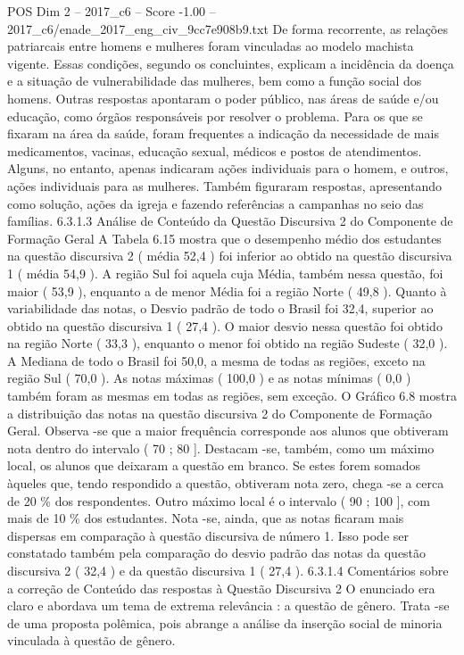 \begin{textsample}{POS Dim 2 – 2017\_c6 – Score -1.00 – 2017\_c6/enade\_2017\_eng\_civ\_9cc7e908b9.txt}
De forma recorrente, as relações patriarcais entre homens e mulheres foram vinculadas ao modelo machista vigente.
Essas condições, segundo os concluintes, explicam a incidência da doença e a situação de vulnerabilidade das mulheres, bem como a função social dos homens.
Outras respostas apontaram o poder público, nas áreas de saúde e/ou educação, como órgãos responsáveis por resolver o problema.
Para os que se fixaram na área da saúde, foram frequentes a indicação da necessidade de mais medicamentos, vacinas, educação sexual, médicos e postos de atendimentos.
Alguns, no entanto, apenas indicaram ações individuais para o homem, e outros, ações individuais para as mulheres.
Também figuraram respostas, apresentando como solução, ações da igreja e fazendo referências a campanhas no seio das famílias. 6.3.1.3 Análise de Conteúdo da Questão Discursiva 2 do Componente de Formação Geral A Tabela 6.15 mostra que o desempenho médio dos estudantes na questão discursiva 2 ( média 52,4 ) foi inferior ao obtido na questão discursiva 1 ( média 54,9 ).
A região Sul foi aquela cuja Média, também nessa questão, foi maior ( 53,9 ), enquanto a de menor Média foi a região Norte ( 49,8 ).
Quanto à variabilidade das notas, o Desvio padrão de todo o Brasil foi 32,4, superior ao obtido na questão discursiva 1 ( 27,4 ).
O maior desvio nessa questão foi obtido na região Norte ( 33,3 ), enquanto o menor foi obtido na região Sudeste ( 32,0 ).
A Mediana de todo o Brasil foi 50,0, a mesma de todas as regiões, exceto na região Sul ( 70,0 ).
As notas máximas ( 100,0 ) e as notas mínimas ( 0,0 ) também foram as mesmas em todas as regiões, sem exceção.
O Gráfico 6.8 mostra a distribuição das notas na questão discursiva 2 do Componente de Formação Geral.
Observa -se que a maior frequência corresponde aos alunos que obtiveram nota dentro do intervalo ( 70 ; 80 ].
Destacam -se, também, como um máximo local, os alunos que deixaram a questão em branco.
Se estes forem somados àqueles que, tendo respondido a questão, obtiveram nota zero, chega -se a cerca de 20 \% dos respondentes.
Outro máximo local é o intervalo ( 90 ; 100 ], com mais de 10 \% dos estudantes.
Nota -se, ainda, que as notas ficaram mais dispersas em comparação à questão discursiva de número 1.
Isso pode ser constatado também pela comparação do desvio padrão das notas da questão discursiva 2 ( 32,4 ) e da questão discursiva 1 ( 27,4 ). 6.3.1.4 Comentários sobre a correção de Conteúdo das respostas à Questão Discursiva 2 O enunciado era claro e abordava um tema de extrema relevância : a questão de gênero.
Trata -se de uma proposta polêmica, pois abrange a análise da inserção social de minoria vinculada à questão de gênero.

\end{textsample}
